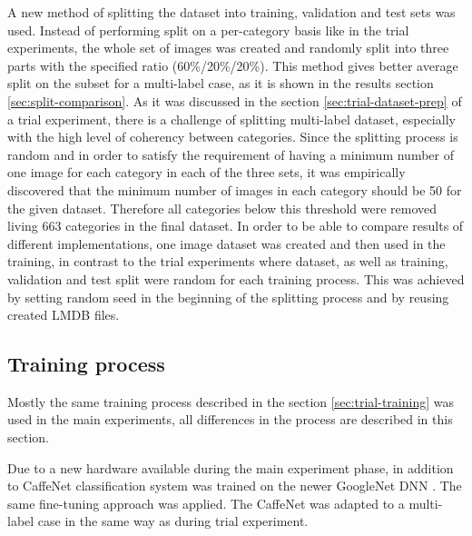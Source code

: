     A new method of splitting the dataset into training, validation and test sets was used. Instead of performing split on a per-category basis like in the trial experiments, the whole set of images was created and randomly split into three parts with the specified ratio (60\%/20\%/20\%). This method gives better average split on the subset for a multi-label case, as it is shown in the results section \ref{sec:split-comparison}. As it was discussed in the section \ref{sec:trial-dataset-prep} of a trial experiment, there is a challenge of splitting multi-label dataset, especially with the high level of coherency between categories. Since the splitting process is random and in order to satisfy the requirement of having a minimum number of one image for each category in each of the three sets, it was empirically discovered that the minimum number of images in each category should be 50 for the given dataset. Therefore all categories below this threshold were removed living 663 categories in the final dataset. In order to be able to compare results of different implementations, one image dataset was created and then used in the training, in contrast to the trial experiments where dataset, as well as training, validation and test split were random for each training process. This was achieved by setting random seed in the beginning of the splitting process and by reusing created LMDB files.
    
    
    
    \subsection{Training process}
    Mostly the same training process described in the section \ref{sec:trial-training} was used in the main experiments, all differences in the process are described in this section. 
    
    Due to a new hardware available during the main experiment phase, in addition to CaffeNet classification system was trained on the newer GoogleNet DNN \cite{Szegedy2015GoingDeeper}. The same fine-tuning approach was applied. The CaffeNet was adapted to a multi-label case in the same way as during trial experiment.
    
